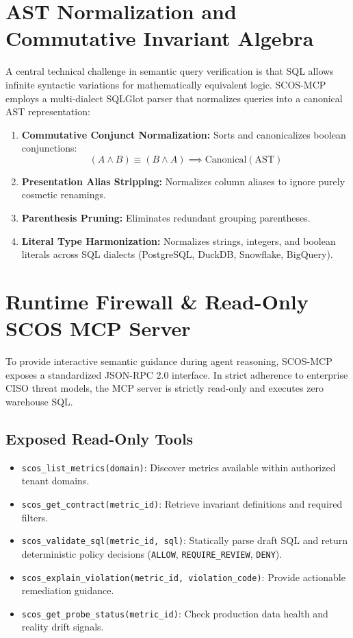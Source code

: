 \documentclass[11pt,a4paper]{article}
\begin{document}
\section{AST Normalization and Commutative Invariant Algebra}
\label{sec:algebra}

A central technical challenge in semantic query verification is that SQL allows infinite syntactic variations for mathematically equivalent logic. SCOS-MCP employs a multi-dialect SQLGlot parser that normalizes queries into a canonical AST representation:

\begin{enumerate}[noitemsep]
    \item \textbf{Commutative Conjunct Normalization:} Sorts and canonicalizes boolean conjunctions:
    \begin{equation}
    (A \land B) \equiv (B \land A) \implies \text{Canonical}(\text{AST})
    \end{equation}
    \item \textbf{Presentation Alias Stripping:} Normalizes column aliases to ignore purely cosmetic renamings.
    \item \textbf{Parenthesis Pruning:} Eliminates redundant grouping parentheses.
    \item \textbf{Literal Type Harmonization:} Normalizes strings, integers, and boolean literals across SQL dialects (PostgreSQL, DuckDB, Snowflake, BigQuery).
\end{enumerate}

\section{Runtime Firewall \& Read-Only SCOS MCP Server}
\label{sec:mcp}

To provide interactive semantic guidance during agent reasoning, SCOS-MCP exposes a standardized JSON-RPC 2.0 interface. In strict adherence to enterprise CISO threat models, the MCP server is strictly read-only and executes zero warehouse SQL.

\subsection{Exposed Read-Only Tools}
\begin{itemize}[noitemsep]
    \item \texttt{scos\_list\_metrics(domain)}: Discover metrics available within authorized tenant domains.
    \item \texttt{scos\_get\_contract(metric\_id)}: Retrieve invariant definitions and required filters.
    \item \texttt{scos\_validate\_sql(metric\_id, sql)}: Statically parse draft SQL and return deterministic policy decisions (\texttt{ALLOW}, \texttt{REQUIRE\_REVIEW}, \texttt{DENY}).
    \item \texttt{scos\_explain\_violation(metric\_id, violation\_code)}: Provide actionable remediation guidance.
    \item \texttt{scos\_get\_probe\_status(metric\_id)}: Check production data health and reality drift signals.
\end{itemize}
\end{document}
